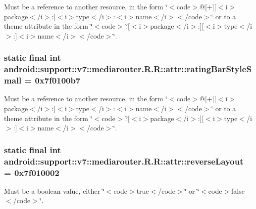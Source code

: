 Must be a reference to another resource, in the form \char`\"{}$<$code$>$@\mbox{[}+\mbox{]}\mbox{[}$<$i$>$package$<$/i$>$:\mbox{]}$<$i$>$type$<$/i$>$:$<$i$>$name$<$/i$>$$<$/code$>$\char`\"{} or to a theme attribute in the form \char`\"{}$<$code$>$?\mbox{[}$<$i$>$package$<$/i$>$:\mbox{]}\mbox{[}$<$i$>$type$<$/i$>$:\mbox{]}$<$i$>$name$<$/i$>$$<$/code$>$\char`\"{}. \hypertarget{classandroid_1_1support_1_1v7_1_1mediarouter_1_1_r_1_1attr_58ebc9a84a0f0b7f27bed10a47a868b0}{
\subsubsection[{ratingBarStyleSmall}]{\setlength{\rightskip}{0pt plus 5cm}static final int android::support::v7::mediarouter.R.R::attr::ratingBarStyleSmall = 0x7f0100b7}}
\label{classandroid_1_1support_1_1v7_1_1mediarouter_1_1_r_1_1attr_58ebc9a84a0f0b7f27bed10a47a868b0}


Must be a reference to another resource, in the form \char`\"{}$<$code$>$@\mbox{[}+\mbox{]}\mbox{[}$<$i$>$package$<$/i$>$:\mbox{]}$<$i$>$type$<$/i$>$:$<$i$>$name$<$/i$>$$<$/code$>$\char`\"{} or to a theme attribute in the form \char`\"{}$<$code$>$?\mbox{[}$<$i$>$package$<$/i$>$:\mbox{]}\mbox{[}$<$i$>$type$<$/i$>$:\mbox{]}$<$i$>$name$<$/i$>$$<$/code$>$\char`\"{}. \hypertarget{classandroid_1_1support_1_1v7_1_1mediarouter_1_1_r_1_1attr_66aca125f0385edd577f5a27196a8b61}{
\subsubsection[{reverseLayout}]{\setlength{\rightskip}{0pt plus 5cm}static final int android::support::v7::mediarouter.R.R::attr::reverseLayout = 0x7f010002}}
\label{classandroid_1_1support_1_1v7_1_1mediarouter_1_1_r_1_1attr_66aca125f0385edd577f5a27196a8b61}


Must be a boolean value, either \char`\"{}$<$code$>$true$<$/code$>$\char`\"{} or \char`\"{}$<$code$>$false$<$/code$>$\char`\"{}. 

